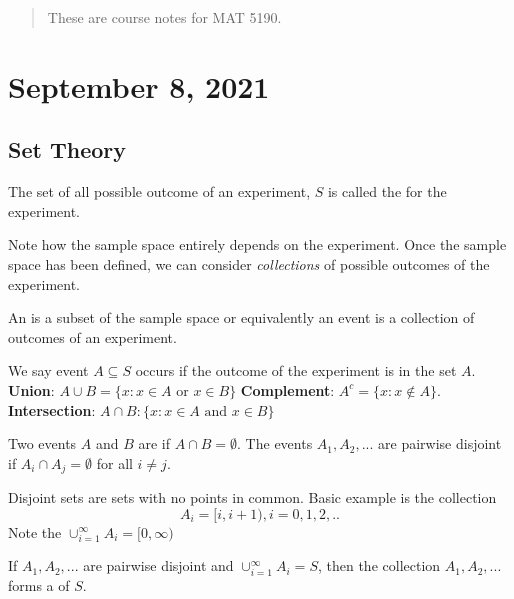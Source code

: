 \begin{abstract}
    These are course notes for MAT 5190.
\end{abstract}

\section{September 8, 2021}
\subsection{Set Theory}

\begin{definition}
The set of all possible outcome of an experiment, $S$ is called the  for the experiment.
\end{definition}
Note how the sample space entirely depends on the experiment. Once the sample space has been defined, we can consider \textit{collections} of possible outcomes of the experiment.
\begin{definition}[Event]
An  is a subset of the sample space or equivalently
an event is a collection of outcomes of an experiment.
\end{definition}
We say event $A \subseteq S$ occurs if the outcome of the experiment is in the set $A$.
\textbf{Union}: 
$A\cup B = 
\{
x: x \in A \text{ or } x \in B
\}
$
\textbf{Complement}:
$A^c = 
\{
x: x \notin A
\}$.
\textbf{Intersection}:
$
A \cap B: 
\{
x: x \in A \text{ and } x \in B
\}
$

\begin{definition}
Two events $A$ and $B$ are   if $A \cap B = \emptyset$. The events $A_1, A_2, ...$ are pairwise disjoint if $A_i \cap A_j = \emptyset$ for all $i \neq j$.
\end{definition}

\begin{example}
    Disjoint sets are sets with no points in common. Basic example is the collection
    $$
    A_i = [i, i+1), i = 0,1,2,..
    $$
    Note the $\cup_{i=1}^{\infty}A_i = [0, \infty)$
\end{example}

\begin{definition}[Partition]
If $A_1, A_2,...$ are pairwise disjoint and $ \cup_{i=1}^{\infty}A_i = S$, then the collection $A_1, A_2,...$ forms a  of $S$.
\end{definition}
